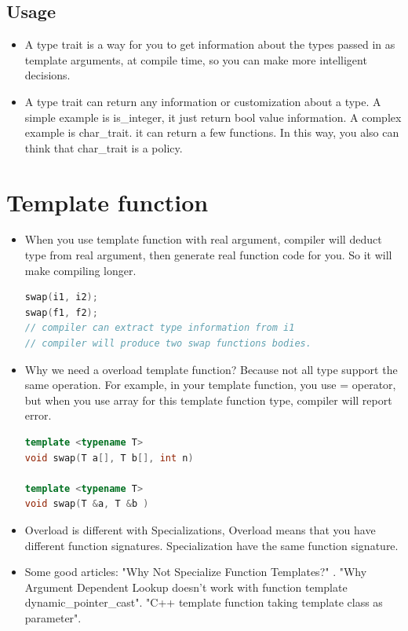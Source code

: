 \documentclass[a4paper,11pt,twoside]{book}
\begin{document}
\subsection{Usage}
\begin{itemize}
	\item A type trait is a way for you to get information about the types passed in as template arguments, at compile time, so you can make more intelligent decisions. 
	
	\item A type trait can return any information or customization about a type. A simple example is is\_integer, it just return bool value information. A complex example is char\_trait. it can return a few functions. In this way, you also can think that char\_trait is a policy. 
	
\end{itemize}


\section{Template function}
\begin{itemize}
	\item When you use template function with real argument, compiler will deduct type from real argument, then generate real function code for you.  So it will make compiling longer.
	
\begin{lstlisting}[frame=single, language=c++]
swap(i1, i2);
swap(f1, f2);
// compiler can extract type information from i1
// compiler will produce two swap functions bodies.
\end{lstlisting}

	\item Why we need a overload template function? Because not all type support the same operation. For example, in your template function, you use = operator, but when you use array for this template function type, compiler will report error.
\begin{lstlisting}[frame=single, language=c++]
template <typename T>
void swap(T a[], T b[], int n)

template <typename T>
void swap(T &a, T &b )
\end{lstlisting}

\item Overload is different with Specializations, Overload means that you have different function signatures. Specialization have the same function signature.

\item Some good articles:\newline
"Why Not Specialize Function Templates?" .
\newline
"Why Argument Dependent Lookup doesn't work with function template dynamic\_pointer\_cast". 
\newline
"C++ template function taking template class as parameter".
\end{itemize}
\end{document}
